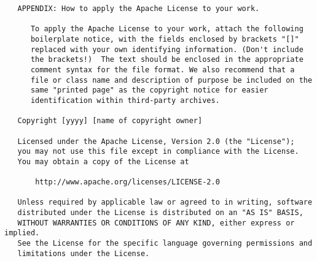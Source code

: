 \documentclass{InsightBook}
\begin{document}
\begin{verbatim}
   APPENDIX: How to apply the Apache License to your work.

      To apply the Apache License to your work, attach the following
      boilerplate notice, with the fields enclosed by brackets "[]"
      replaced with your own identifying information. (Don't include
      the brackets!)  The text should be enclosed in the appropriate
      comment syntax for the file format. We also recommend that a
      file or class name and description of purpose be included on the
      same "printed page" as the copyright notice for easier
      identification within third-party archives.

   Copyright [yyyy] [name of copyright owner]

   Licensed under the Apache License, Version 2.0 (the "License");
   you may not use this file except in compliance with the License.
   You may obtain a copy of the License at

       http://www.apache.org/licenses/LICENSE-2.0

   Unless required by applicable law or agreed to in writing, software
   distributed under the License is distributed on an "AS IS" BASIS,
   WITHOUT WARRANTIES OR CONDITIONS OF ANY KIND, either express or implied.
   See the License for the specific language governing permissions and
   limitations under the License.
\end{verbatim}
\end{document}
